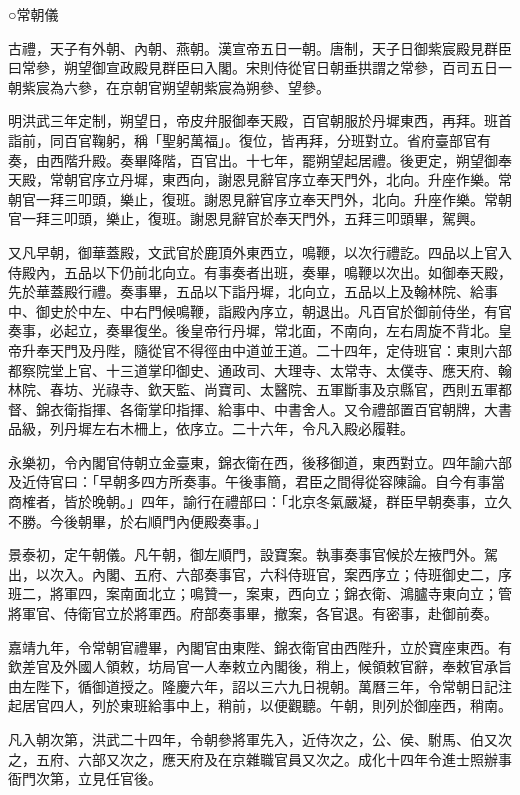 ○常朝儀

古禮，天子有外朝、內朝、燕朝。漢宣帝五日一朝。唐制，天子日御紫宸殿見群臣曰常參，朔望御宣政殿見群臣曰入閣。宋則侍從官日朝垂拱謂之常參，百司五日一朝紫宸為六參，在京朝官朔望朝紫宸為朔參、望參。

明洪武三年定制，朔望日，帝皮弁服御奉天殿，百官朝服於丹墀東西，再拜。班首詣前，同百官鞠躬，稱「聖躬萬福」。復位，皆再拜，分班對立。省府臺部官有奏，由西階升殿。奏畢降階，百官出。十七年，罷朔望起居禮。後更定，朔望御奉天殿，常朝官序立丹墀，東西向，謝恩見辭官序立奉天門外，北向。升座作樂。常朝官一拜三叩頭，樂止，復班。謝恩見辭官序立奉天門外，北向。升座作樂。常朝官一拜三叩頭，樂止，復班。謝恩見辭官於奉天門外，五拜三叩頭畢，駕興。

又凡早朝，御華蓋殿，文武官於鹿頂外東西立，鳴鞭，以次行禮訖。四品以上官入侍殿內，五品以下仍前北向立。有事奏者出班，奏畢，鳴鞭以次出。如御奉天殿，先於華蓋殿行禮。奏事畢，五品以下詣丹墀，北向立，五品以上及翰林院、給事中、御史於中左、中右門候鳴鞭，詣殿內序立，朝退出。凡百官於御前侍坐，有官奏事，必起立，奏畢復坐。後皇帝行丹墀，常北面，不南向，左右周旋不背北。皇帝升奉天門及丹陛，隨從官不得徑由中道並王道。二十四年，定侍班官：東則六部都察院堂上官、十三道掌印御史、通政司、大理寺、太常寺、太僕寺、應天府、翰林院、春坊、光祿寺、欽天監、尚寶司、太醫院、五軍斷事及京縣官，西則五軍都督、錦衣衛指揮、各衛掌印指揮、給事中、中書舍人。又令禮部置百官朝牌，大書品級，列丹墀左右木柵上，依序立。二十六年，令凡入殿必履鞋。

永樂初，令內閣官侍朝立金臺東，錦衣衛在西，後移御道，東西對立。四年諭六部及近侍官曰：「早朝多四方所奏事。午後事簡，君臣之間得從容陳論。自今有事當商榷者，皆於晚朝。」四年，諭行在禮部曰：「北京冬氣嚴凝，群臣早朝奏事，立久不勝。今後朝畢，於右順門內便殿奏事。」

景泰初，定午朝儀。凡午朝，御左順門，設寶案。執事奏事官候於左掖門外。駕出，以次入。內閣、五府、六部奏事官，六科侍班官，案西序立；侍班御史二，序班二，將軍四，案南面北立；鳴贊一，案東，西向立；錦衣衛、鴻臚寺東向立；管將軍官、侍衛官立於將軍西。府部奏事畢，撤案，各官退。有密事，赴御前奏。

嘉靖九年，令常朝官禮畢，內閣官由東陛、錦衣衛官由西陛升，立於寶座東西。有欽差官及外國人領敕，坊局官一人奉敕立內閣後，稍上，候領敕官辭，奉敕官承旨由左陛下，循御道授之。隆慶六年，詔以三六九日視朝。萬曆三年，令常朝日記注起居官四人，列於東班給事中上，稍前，以便觀聽。午朝，則列於御座西，稍南。

凡入朝次第，洪武二十四年，令朝參將軍先入，近侍次之，公、侯、駙馬、伯又次之，五府、六部又次之，應天府及在京雜職官員又次之。成化十四年令進士照辦事衙門次第，立見任官後。

